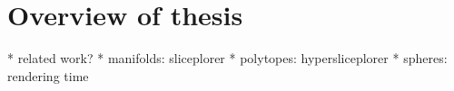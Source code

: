 
\section{Overview of thesis}
\label{overview-of-thesis}

* related work?
* manifolds: sliceplorer
* polytopes: hypersliceplorer
* spheres: rendering time


